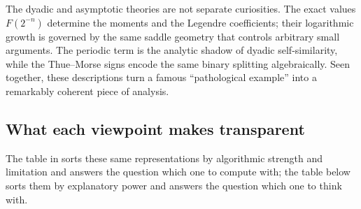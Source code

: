 \documentclass[11pt,oneside]{article}
\theoremstyle{definition}
\theoremstyle{remark}
\begin{document}
The dyadic and asymptotic theories are not separate curiosities.  The exact values
$F(2^{-n})$ determine the moments and the Legendre coefficients; their logarithmic growth is
governed by the same saddle geometry that controls arbitrary small arguments.  The periodic
term is the analytic shadow of dyadic self-similarity, while the Thue--Morse signs encode the
same binary splitting algebraically.  Seen together, these descriptions turn a famous
``pathological example'' into a remarkably coherent piece of analysis.


\subsection{What each viewpoint makes transparent}
\label{sec:aud-viewpoints}

The table in  sorts these same representations by algorithmic strength
and limitation and answers the question which one to compute with; the table below sorts them
by explanatory power and answers the question which one to think with.
\end{document}
